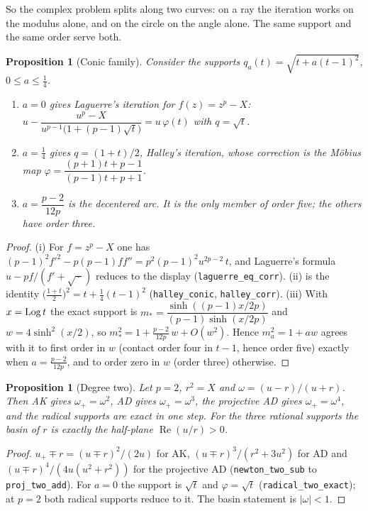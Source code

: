 \documentclass[10pt,a4paper]{article}
\theoremstyle{plain}
\newtheorem{proposition}[theorem]{Proposition}
\theoremstyle{remark}
\numberwithin{equation}{section}
\DeclareMathOperator{\re}{Re}\DeclareMathOperator{\im}{Im}
\newcommand{\lean}[1]{\texttt{#1}}
\begin{document}
So the complex problem splits along two curves: on a ray the iteration works on the modulus alone,
and on the circle on the angle alone. The same support and the same order serve both.

\begin{proposition}[Conic family]\label{prop:conic}
Consider the supports $q_a(t)=\sqrt{t+a(t-1)^{2}}$, $0\le a\le\tfrac14$.
\begin{enumerate}
\item[(i)] $a=0$ gives Laguerre's iteration for $f(z)=z^{p}-X$:
 $u-\dfrac{u^{p}-X}{u^{p-1}\bigl(1+(p-1)\sqrt t\bigr)}=u\,\varphi(t)$ with $q=\sqrt t$.
\item[(ii)] $a=\tfrac14$ gives $q=(1+t)/2$, Halley's iteration, whose correction is the M\"obius map
 $\varphi=\dfrac{(p+1)t+p-1}{(p-1)t+p+1}$.
\item[(iii)] $a=\dfrac{p-2}{12p}$ is the decentered arc. It is the only member of order five; the
 others have order three.
\end{enumerate}
\end{proposition}

\begin{proof}
(i) For $f=z^{p}-X$ one has $(p-1)^{2}f'^{2}-p(p-1)ff''=p^{2}(p-1)^{2}u^{2p-2}\,t$, and Laguerre's
formula $u-pf/(f'+\sqrt{\,\cdot\,})$ reduces to the display (\lean{laguerre\_eq\_corr}). (ii) is the
identity $\bigl(\tfrac{1+t}2\bigr)^{2}=t+\tfrac14(t-1)^{2}$ (\lean{halley\_conic},
\lean{halley\_corr}). (iii) With $x=\operatorname{Log} t$ the exact support is $m_*=\dfrac{\sinh((p-1)x/2p)}{(p-1)\sinh(x/2p)}$ and
$w=4\sinh^{2}(x/2)$, so $m_*^{2}=1+\frac{p-2}{12p}\,w+O(w^{2})$. Hence $m_a^{2}=1+aw$ agrees with it to first order in $w$ (contact
order four in $t-1$, hence order five) exactly when $a=\frac{p-2}{12p}$, and to order zero in $w$
(order three) otherwise.
\end{proof}

\begin{proposition}[Degree two]\label{prop:two}
Let $p=2$, $r^{2}=X$ and $\omega=(u-r)/(u+r)$. Then AK gives $\omega_+=\omega^{2}$, AD gives
$\omega_+=\omega^{3}$, the projective AD gives $\omega_+=\omega^{4}$, and the radical supports are
exact in one step. For the three rational supports the basin of $r$ is exactly the half-plane
$\re(u/r)>0$.
\end{proposition}

\begin{proof}
$u_+\mp r=(u\mp r)^{2}/(2u)$ for AK, $(u\mp r)^{3}/(r^{2}+3u^{2})$ for AD and
$(u\mp r)^{4}/(4u(u^{2}+r^{2}))$ for the projective AD (\lean{newton\_two\_sub} to
\lean{proj\_two\_add}). For $a=0$ the support is $\sqrt t$ and $\varphi=\sqrt t$
(\lean{radical\_two\_exact}); at $p=2$ both radical supports reduce to it. The basin statement is
$|\omega|<1$.
\end{proof}
\end{document}
